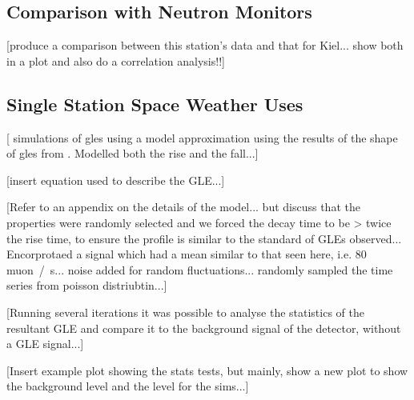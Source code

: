 \subsection{Comparison with Neutron Monitors}\label{sec:HS_14008_vs_Kiel}

[produce a comparison between this station's data and that for Kiel... show both in a plot and also do a correlation analysis!!]



\subsection{Single Station Space Weather Uses}\label{sec:HS_14008_single_sims}

[ simulations of \glspl{gle} using a model approximation using the results of the shape of \glspl{gle} from \citet{strauss_pulse_2017}. Modelled both the rise and the fall...]

[insert equation used to describe the GLE...]

[Refer to an appendix on the details of the model... but discuss that the properties were randomly selected and we forced the decay time to be > twice the rise time, to ensure the profile is similar to the standard of GLEs observed... Encorprotaed a signal which had a mean similar to that seen here, i.e. 80 muon~/~s... noise added for random fluctuations... randomly sampled the time series from poisson distriubtin...]

[Running several iterations it was possible to analyse the statistics of the resultant GLE and compare it to the background signal of the detector, without a GLE signal...]

[Insert example plot showing the stats tests, but mainly, show a new plot to show the background level and the level for the sims...]


